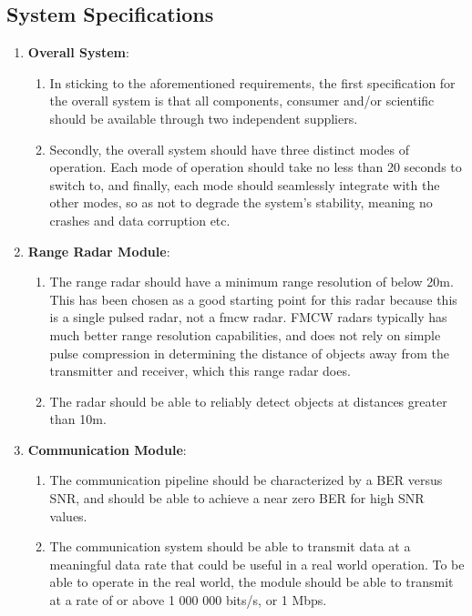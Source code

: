 \documentclass[11pt]{report}
\begin{document}
\subsection{System Specifications}\label{sec:system_specifications}

\begin{enumerate}
    \item \textbf{Overall System}: 
    \begin{enumerate}
        \item In sticking to the aforementioned requirements, the first specification for the overall system is that all components, consumer and/or scientific should be available through two independent suppliers.
        \item Secondly, the overall system should have three distinct modes of operation. Each mode of operation should take no less than 20 seconds to switch to, and finally, each mode should seamlessly integrate with the other modes, so as not to degrade the system's stability, meaning no crashes and data corruption etc.
    \end{enumerate}
    \item \textbf{Range Radar Module}: 
    \begin{enumerate}
        \item The range radar should have a minimum range resolution of below 20m. This has been chosen as a good starting point for this radar because this is a single pulsed radar, not a \gls{fmcw} radar. FMCW radars typically has much better range resolution capabilities, and does not rely on simple pulse compression in determining the distance of objects away from the transmitter and receiver, which this range radar does.
        \item The radar should be able to reliably detect objects at distances greater than 10m. 
    \end{enumerate}
    \item \textbf{Communication Module}:
    \begin{enumerate}
        \item The communication pipeline should be characterized by a BER versus SNR, and should be able to achieve a near zero BER for high SNR values.
        \item The communication system should be able to transmit data at a meaningful data rate that could be useful in a real world operation. To be able to operate in the real world, the module should be able to transmit at a rate of or above 1 000 000 bits/s, or 1 Mbps.

\end{enumerate}
\end{enumerate}
\end{document}
